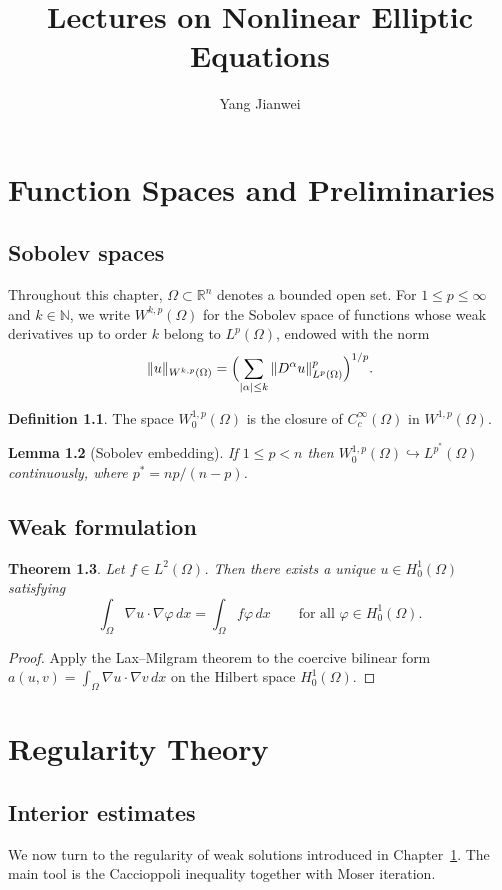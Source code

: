 \documentclass[11pt]{amsbook}
\title{Lectures on Nonlinear Elliptic Equations}
\author{Yang Jianwei}
\newtheorem{theorem}{Theorem}[chapter]
\newtheorem{lemma}[theorem]{Lemma}
\theoremstyle{definition}
\newtheorem{definition}[theorem]{Definition}
\newcommand{\R}{\mathbb{R}}
\newcommand{\N}{\mathbb{N}}
\newcommand{\Om}{\Omega}
\begin{document}
\frontmatter
\maketitle

\tableofcontents

\mainmatter
\chapter{Function Spaces and Preliminaries}\label{ch:spaces}

\section{Sobolev spaces}

Throughout this chapter, $\Om\subset\R^n$ denotes a bounded open set.
For $1\le p\le\infty$ and $k\in\N$, we write $W^{k,p}(\Om)$ for the
Sobolev space of functions whose weak derivatives up to order $k$
belong to $L^p(\Om)$, endowed with the norm
\begin{equation}
  \|u\|_{W^{k,p}(\Om)}
  = \Bigl(\sum_{|\alpha|\le k}\|D^\alpha u\|_{L^p(\Om)}^p\Bigr)^{1/p}.
\end{equation}

\begin{definition}
The space $W^{1,p}_0(\Om)$ is the closure of $C_c^\infty(\Om)$ in
$W^{1,p}(\Om)$.
\end{definition}

\begin{lemma}[Sobolev embedding]
If $1\le p<n$ then $W^{1,p}_0(\Om)\hookrightarrow L^{p^*}(\Om)$
continuously, where $p^*=np/(n-p)$.
\end{lemma}

\section{Weak formulation}

\begin{theorem}
Let $f\in L^2(\Om)$. Then there exists a unique
$u\in H^1_0(\Om)$ satisfying
\begin{equation}
  \int_{\Om}\nabla u\cdot\nabla\varphi\,dx=\int_{\Om} f\varphi\,dx
  \qquad\text{for all } \varphi\in H^1_0(\Om).
\end{equation}
\end{theorem}

\begin{proof}
Apply the Lax--Milgram theorem to the coercive bilinear form
$a(u,v)=\int_{\Om}\nabla u\cdot\nabla v\,dx$ on the Hilbert space
$H^1_0(\Om)$.
\end{proof}

\chapter{Regularity Theory}\label{ch:regularity}

\section{Interior estimates}

We now turn to the regularity of weak solutions introduced in
Chapter~\ref{ch:spaces}. The main tool is the Caccioppoli inequality
together with Moser iteration.
\end{document}
